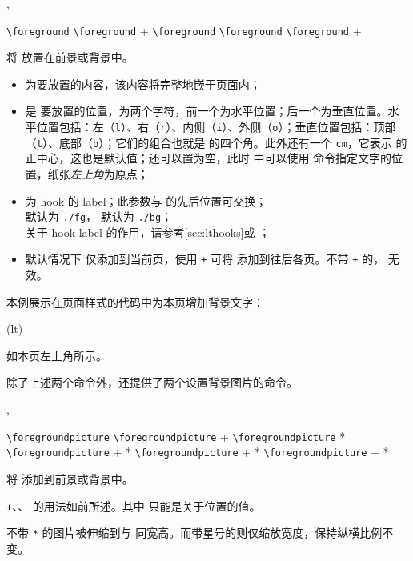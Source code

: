 \documentclass[twoside]{book}
\def\xampletext{\par}
\def\xampleprint{\xamplecode \xampleline \xampletext}
\begin{document}
\begin{function}{\foreground,\background}
  \begin{syntax}
    \verb|\foreground|   
    \verb|\foreground| + 
    \verb|\foreground|  
    \verb|\foreground|  
    \verb|\foreground| +   
  \end{syntax}
将  放置在前景或背景中。

\begin{itemize}[nosep]
  \item {} 为要放置的内容，该内容将完整地嵌于页面内；
  \item {} 是  要放置的位置，为两个字符，前一个为水平位置；后一个为垂直位置。水平位置包括：左（\texttt{l}）、右（\texttt{r}）、内侧（\texttt{i}）、外侧（\texttt{o}）；垂直位置包括：顶部（\texttt{t}）、底部（\texttt{b}）；它们的组合也就是  的四个角。此外还有一个 \texttt{cm}，它表示  的正中心，这也是默认值；还可以置为空，此时  中可以使用  命令指定文字的位置，纸张\emph{左上角}为原点；
  \item {} 为 hook 的 label；此参数与  的先后位置可交换；\\ 
   默认为 \texttt{./fg}， 默认为 \texttt{./bg}；\\
  关于 hook label 的作用，请参考\cref{sec:lthooks}或 ；
  \item 默认情况下  仅添加到当前页，使用 \texttt{+} 可将  添加到往后各页。不带 \texttt+ 的， 无效。
\end{itemize}
\end{function}

本例展示在页面样式的代码中为本页增加背景文字：
\needspace{3cm}
\begin{xample}
\background(lt){\textcolor{red}{\LARGE\WhuTeX}}
\stopxamplecode
\xampleprint
如本页左上角所示。
\end{xample}

除了上述两个命令外，还提供了两个设置背景图片的命令。

\begin{function}{\foregroundpicture,\backgroundpicture}
  \begin{syntax}
    \verb|\foregroundpicture|     
    \verb|\foregroundpicture| +   
    \verb|\foregroundpicture|   * 
    \verb|\foregroundpicture| + * 
    \verb|\foregroundpicture| + *   
    \verb|\foregroundpicture| + *    
  \end{syntax}
将  添加到前景或背景中。

\texttt{+}、、 的用法如前所述。其中  只能是关于位置的值。

不带 \verb|*| 的图片被伸缩到与  同宽高。而带星号的则仅缩放宽度，保持纵横比例不变。
\end{function}
\end{document}
